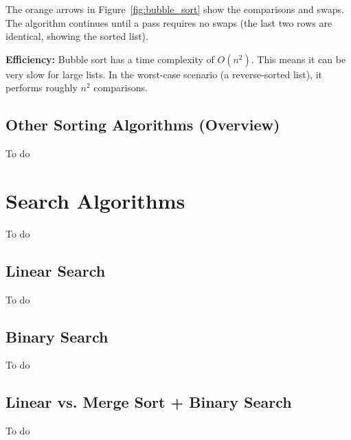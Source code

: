 \documentclass[12pt, a4paper]{article}
\begin{document}
The orange arrows in Figure~\ref{fig:bubble_sort} show the comparisons and swaps. The algorithm continues until a pass requires no swaps (the last two rows are identical, showing the sorted list).

\textbf{Efficiency:}  Bubble sort has a time complexity of $O(n^2)$.  This means it can be very slow for large lists. In the worst-case scenario (a reverse-sorted list), it performs roughly $n^2$ comparisons.



\subsection{Other Sorting Algorithms (Overview)}

To do


\section{Search Algorithms}

To do

\subsection{Linear Search}

To do

\subsection{Binary Search}

To do


\subsection{Linear vs. Merge Sort + Binary Search}

To do
\end{document}
